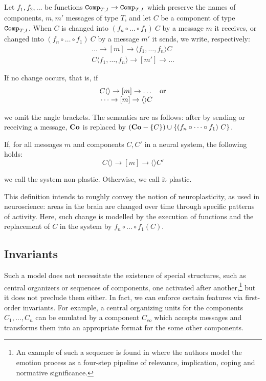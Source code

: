 \begin{definition}
	Let $f_1,f_2,\dots$ be functions $\texttt{Comp}_{T,I} \rightarrow \texttt{Comp}_{T,I}$ which preserve the names of components, $m,m'$ messages of type $T$, and let $C$ be a component of type $\texttt{Comp}_{T,I}$. When $C$ is changed into $(f_n \circ \dots \circ f_1)\ C$ by a message $m$ it receives, or changed into $(f_n \circ \dots \circ f_1)\ C$ by a message $m'$ it sends, we write, respectively:
	$$
		\begin{array}{c}
			\dots \rightarrow [m] \rightarrow \langle f_1,\dots,f_n \rangle C\\
			C\langle f_1,\dots,f_n \rangle \rightarrow [m'] \rightarrow \dots
		\end{array}
	$$
	
	\noindent
	If no change occurs, that is, if
	$$
		\begin{array}{r l}
			C\langle\rangle \rightarrow [m] \rightarrow \dots & \textnormal{or}\\
			\dots \rightarrow [m] \rightarrow \langle\rangle C
		\end{array}
	$$
	
	\noindent
	we omit the angle brackets.
	The semantics are as follows: after by sending or receiving a message, $\mathbf{Co}$ is replaced by $(\mathbf{Co} - \{C\}) \cup \{(f_n \circ \dots \circ f_1)\ C \}$.
\end{definition}

\begin{definition}
	If, for all messages $m$ and components $C, C'$ in a neural system, the following holds:
	$$
		C\langle\rangle \rightarrow [m] \rightarrow \langle\rangle C'
	$$
	
	\noindent
	we call the system non-plastic. Otherwise, we call it plastic.
\end{definition}


This definition intends to roughly convey the notion of neuroplasticity, as used in neuroscience: areas in the brain are changed over time through specific patterns of activity. Here, such change is modelled by the execution of functions and the replacement of $C$ in the system by $f_n \circ \dots \circ f_1 (C)$.

\subsection{Invariants}

Such a model does not necessitate the existence of special structures, such as central organizers or sequences of components, one activated after another,\footnote{An example of such a sequence is found in \cite{DBLP:journals/nn/SanderGS05} where the authors model the emotion process as a four-step pipeline of relevance, implication, coping and normative significance.} but it does not preclude them either. In fact, we can enforce certain features via first-order invariants. For example, a central organizing units for the components $C_1,\dots,C_n$ can be emulated by a component $C_{co}$ which accepts messages and transforms them into an appropriate format for the some other components.

